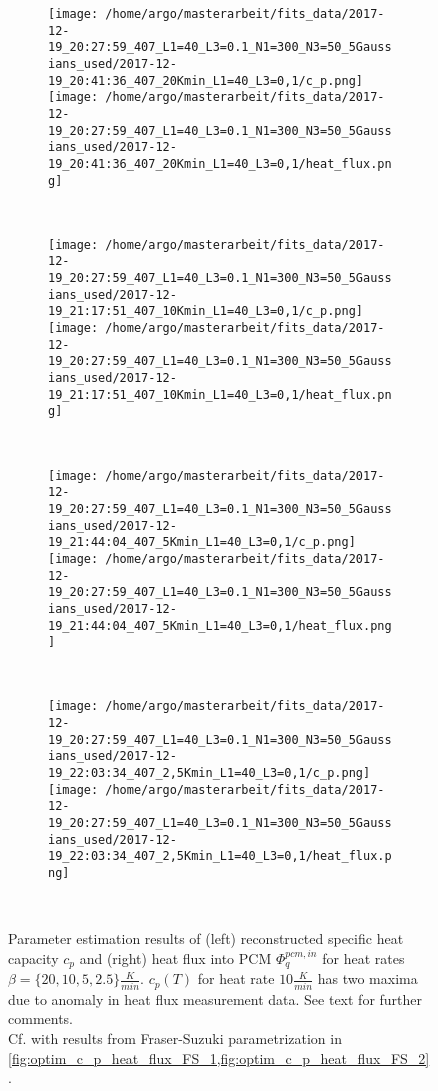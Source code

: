 \documentclass{scrartcl}[12pt, halfparskip]
\numberwithin{equation}{section}
\numberwithin{figure}{section}
\numberwithin{table}{section}
\begin{document}
\begin{figure}[H]
	\begin{subfigure}{1.\textwidth}
		\texttt{[image: /home/argo/masterarbeit/fits\_data/2017-12-19\_20:27:59\_407\_L1=40\_L3=0.1\_N1=300\_N3=50\_5Gaussians\_used/2017-12-19\_20:41:36\_407\_20Kmin\_L1=40\_L3=0,1/c\_p.png]}
		\texttt{[image: /home/argo/masterarbeit/fits\_data/2017-12-19\_20:27:59\_407\_L1=40\_L3=0.1\_N1=300\_N3=50\_5Gaussians\_used/2017-12-19\_20:41:36\_407\_20Kmin\_L1=40\_L3=0,1/heat\_flux.png]}
	\end{subfigure} \\[1ex]
	
	\begin{subfigure}{1.\textwidth}
		\texttt{[image: /home/argo/masterarbeit/fits\_data/2017-12-19\_20:27:59\_407\_L1=40\_L3=0.1\_N1=300\_N3=50\_5Gaussians\_used/2017-12-19\_21:17:51\_407\_10Kmin\_L1=40\_L3=0,1/c\_p.png]}
		\texttt{[image: /home/argo/masterarbeit/fits\_data/2017-12-19\_20:27:59\_407\_L1=40\_L3=0.1\_N1=300\_N3=50\_5Gaussians\_used/2017-12-19\_21:17:51\_407\_10Kmin\_L1=40\_L3=0,1/heat\_flux.png]}
	\end{subfigure} \\[1ex]
	
	\begin{subfigure}{1.\textwidth}
		\texttt{[image: /home/argo/masterarbeit/fits\_data/2017-12-19\_20:27:59\_407\_L1=40\_L3=0.1\_N1=300\_N3=50\_5Gaussians\_used/2017-12-19\_21:44:04\_407\_5Kmin\_L1=40\_L3=0,1/c\_p.png]}
		\texttt{[image: /home/argo/masterarbeit/fits\_data/2017-12-19\_20:27:59\_407\_L1=40\_L3=0.1\_N1=300\_N3=50\_5Gaussians\_used/2017-12-19\_21:44:04\_407\_5Kmin\_L1=40\_L3=0,1/heat\_flux.png]}
	\end{subfigure} \\[1ex]
	
	\begin{subfigure}{1.\textwidth}
		\texttt{[image: /home/argo/masterarbeit/fits\_data/2017-12-19\_20:27:59\_407\_L1=40\_L3=0.1\_N1=300\_N3=50\_5Gaussians\_used/2017-12-19\_22:03:34\_407\_2,5Kmin\_L1=40\_L3=0,1/c\_p.png]}
		\texttt{[image: /home/argo/masterarbeit/fits\_data/2017-12-19\_20:27:59\_407\_L1=40\_L3=0.1\_N1=300\_N3=50\_5Gaussians\_used/2017-12-19\_22:03:34\_407\_2,5Kmin\_L1=40\_L3=0,1/heat\_flux.png]}
	\end{subfigure} \\[1ex]
	

	\caption{Parameter estimation results of (left) reconstructed specific heat capacity $c_p$ and (right) heat flux into PCM $\varPhi_q^{pcm,in}$ for heat rates $\beta=\{ 20, 10, 5, 2.5 \} \frac{K}{min}$. $c_p(T)$ for heat rate $10 \frac{K}{min}$ has two maxima due to anomaly in heat flux measurement data. See text for further comments. \\
	Cf. with results from Fraser-Suzuki parametrization in \cref{fig:optim_c_p_heat_flux_FS_1,fig:optim_c_p_heat_flux_FS_2}.}
	\label{fig:optim_c_p_heat_flux_5Gaussians_1}
\end{figure}
\end{document}
